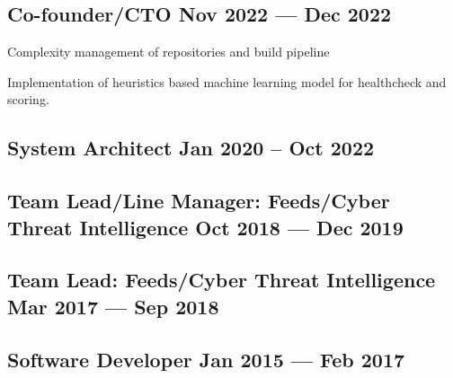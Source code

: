 \subsection{{Co-founder/CTO \hfill Nov 2022 --- Dec 2022}}
\begin{zitemize}
	\item Complexity management of repositories and build pipeline
	\item Implementation of heuristics based machine learning model for healthcheck and scoring.
\end{zitemize}

\subsection{{System Architect \hfill Jan 2020 -- Oct 2022}}
\subsection{{Team Lead/Line Manager: Feeds/Cyber Threat Intelligence \hfill Oct 2018 --- Dec 2019}}
\subsection{{Team Lead: Feeds/Cyber Threat Intelligence \hfill Mar 2017 --- Sep 2018}}
\subsection{{Software Developer \hfill Jan 2015 --- Feb 2017}}
